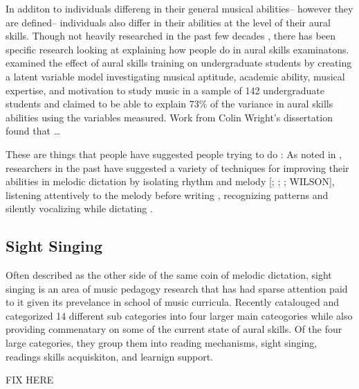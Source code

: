 \documentclass[]{book}
\theoremstyle{definition}
\theoremstyle{definition}
\theoremstyle{definition}
\theoremstyle{remark}
\begin{document}
In additon to individuals differeng in their general musical abilities--
however they are defined-- individuals also differ in their abilities at
the level of their aural skills. Though not heavily researched in the
past few decades \citep{furbyEffectsPeerTutoring2016}, there has been
specific research looking at explaining how people do in aural skills
examinatons. \citet{harrisonEffectsMusicalAptitude1994} examined the
effect of aural skills training on undergraduate students by creating a
latent variable model investigating musical aptitude, academic ability,
musical expertise, and motivation to study music in a sample of 142
undergraduate students and claimed to be able to explain 73\% of the
variance in aural skills abilities using the variables measured. Work
from Colin Wright's dissertation found that \ldots{}
\citep{wrightInvestigatingAuralCase2016}

These are things that people have suggested people trying to do : As
noted in \citet{furbyEffectsPeerTutoring2016}, researchers in the past
have suggested a variety of techniques for improving their abilities in
melodic dictation by isolating rhythm and melody
{[}\citet{bantonRoleVisualAuditory1995};
\citet{blandSightSingingMelodic1984};
\citet{rootMethodicalSightSingingLessons1931}; WILSON{]}, listening
attentively to the melody before writing
\citep{bantonRoleVisualAuditory1995}, recognizing patterns
\citep{bantonRoleVisualAuditory1995, blandSightSingingMelodic1984, rootMethodicalSightSingingLessons1931}
and silently vocalizing while dictating
\citep{klonoskiImprovingDictationAuralSkills2006}.

\hypertarget{sight-singing}{%
\subsection{Sight Singing}\label{sight-singing}}

Often described as the other side of the same coin of melodic dictation,
sight singing is an area of music pedagogy research that has had sparse
attention paid to it given its prevelance in school of music curricula.
Recently \citep{fournierCognitiveStrategiesSightsinging2017a} catalouged
and categorized 14 different sub categories into four larger main
cateogories while also providing commenatary on some of the current
state of aural skills. Of the four large categories, they group them
into reading mechanisms, sight singing, readings skills acquiskiton, and
learnign support.

FIX HERE
\end{document}
